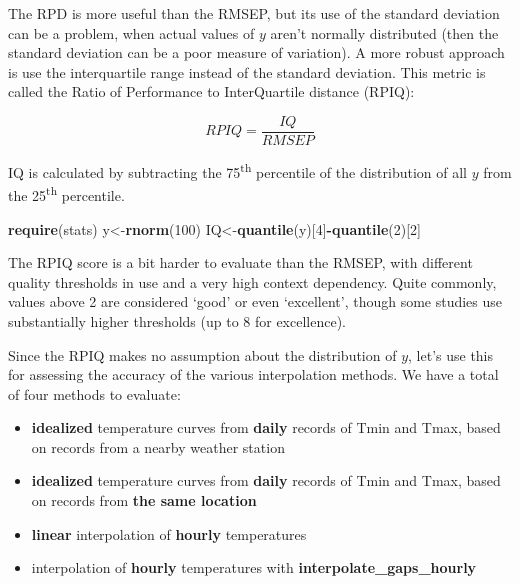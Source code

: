 \documentclass[
]{book}
\newenvironment{Shaded}{\begin{snugshade}}{\end{snugshade}}
\newcommand{\DecValTok}[1]{\textcolor[rgb]{0.00,0.00,0.81}{#1}}
\newcommand{\KeywordTok}[1]{\textcolor[rgb]{0.13,0.29,0.53}{\textbf{#1}}}
\newcommand{\NormalTok}[1]{#1}
\newcommand{\OperatorTok}[1]{\textcolor[rgb]{0.81,0.36,0.00}{\textbf{#1}}}
\providecommand{\tightlist}{%
  \setlength{\itemsep}{0pt}\setlength{\parskip}{0pt}}
\begin{document}
The RPD is more useful than the RMSEP, but its use of the standard deviation can be a problem, when actual values of \(y\) aren't normally distributed (then the standard deviation can be a poor measure of variation). A more robust approach is use the interquartile range instead of the standard deviation. This metric is called the Ratio of Performance to InterQuartile distance (RPIQ):

\[RPIQ=\frac{IQ}{RMSEP}\]

IQ is calculated by subtracting the 75\textsuperscript{th} percentile of the distribution of all \(y\) from the 25\textsuperscript{th} percentile.

\begin{Shaded}
\begin{Highlighting}[]
\KeywordTok{require}\NormalTok{(stats)}
\NormalTok{y<-}\KeywordTok{rnorm}\NormalTok{(}\DecValTok{100}\NormalTok{)}
\NormalTok{IQ<-}\KeywordTok{quantile}\NormalTok{(y)[}\DecValTok{4}\NormalTok{]}\OperatorTok{-}\KeywordTok{quantile}\NormalTok{(}\DecValTok{2}\NormalTok{)[}\DecValTok{2}\NormalTok{]}
\end{Highlighting}
\end{Shaded}

The RPIQ score is a bit harder to evaluate than the RMSEP, with different quality thresholds in use and a very high context dependency. Quite commonly, values above 2 are considered `good' or even `excellent', though some studies use substantially higher thresholds (up to 8 for excellence).

Since the RPIQ makes no assumption about the distribution of \(y\), let's use this for assessing the accuracy of the various interpolation methods. We have a total of four methods to evaluate:

\begin{itemize}
\tightlist
\item
  \textbf{idealized} temperature curves from \textbf{daily} records of Tmin and Tmax, based on records from a nearby weather station
\item
  \textbf{idealized} temperature curves from \textbf{daily} records of Tmin and Tmax, based on records from \textbf{the same location}\\
\item
  \textbf{linear} interpolation of \textbf{hourly} temperatures
\item
  interpolation of \textbf{hourly} temperatures with \textbf{interpolate\_gaps\_hourly}
\end{itemize}
\end{document}
